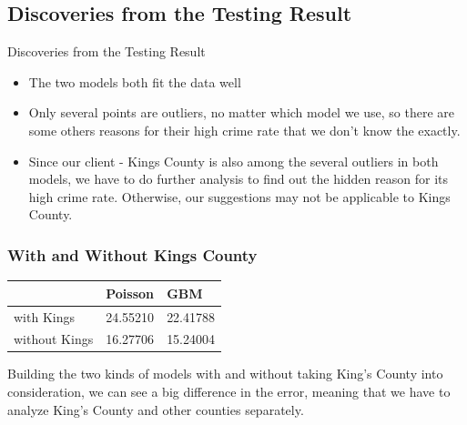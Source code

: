 \documentclass{beamer}
\begin{document}
\subsection{Discoveries from the Testing Result}
\begin{frame}{Discoveries from the Testing Result}
\begin{itemize}
\item The two models both fit the data well
\item Only several points are outliers, no matter which model we use, so there are some others reasons for their high crime rate that we don't know the exactly.
\item Since our client - Kings County is also among the several outliers in both models, we have to do further analysis to find out the hidden reason for its high crime rate. Otherwise, our suggestions may not be applicable to Kings County.
\end{itemize}

\end{frame}



\begin{frame}[fragile]
\frametitle{With and Without Kings County}

 \begin{center}
 \begin{tabular}{ p{3cm}p{2cm}p{2cm}}
 {} &Poisson &GBM \\
 \hline
with Kings  &24.55210 &22.41788\\
without Kings &16.27706 &15.24004\\
 \end{tabular}
 \end{center}

 \bigbreak
 \bigbreak
 
 
Building the two kinds of models with and without taking King's County into consideration, we can see a big difference in the error, meaning that we have to analyze King's County and other counties separately.
\end{frame}
\end{document}
